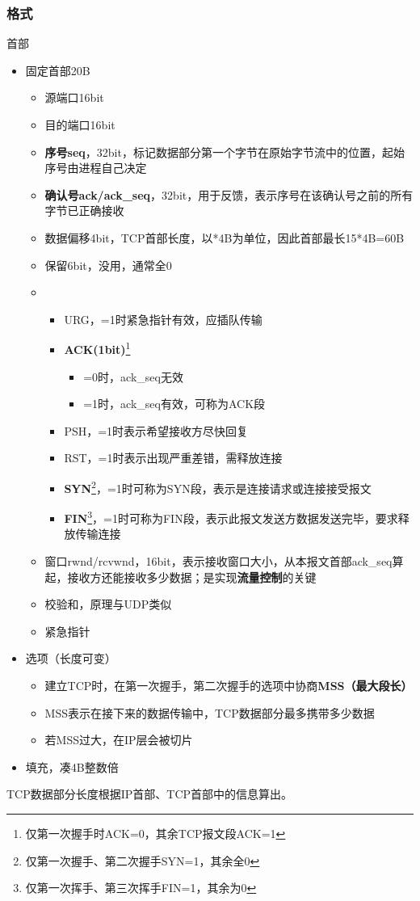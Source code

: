 \subsubsection{格式}
首部\begin{itemize}
    \item 固定首部20B\begin{itemize}
        \item 源端口16bit
        \item 目的端口16bit
        \item \textbf{序号seq}，32bit，标记数据部分第一个字节在原始字节流中的位置，起始序号由进程自己决定
        \item \textbf{确认号ack/ack\_seq}，32bit，用于反馈，表示序号在该确认号之前的所有字节已正确接收
        \item 数据偏移4bit，TCP首部长度，以*4B为单位，因此首部最长15*4B=60B
        \item 保留6bit，没用，通常全0
        \item \begin{itemize}
            \item URG，=1时紧急指针有效，应插队传输
            \item \textbf{ACK(1bit)}\footnote{仅第一次握手时ACK=0，其余TCP报文段ACK=1}
            \begin{itemize}
                \item =0时，ack\_seq无效
                \item =1时，ack\_seq有效，可称为ACK段
            \end{itemize}
            \item PSH，=1时表示希望接收方尽快回复
            \item RST，=1时表示出现严重差错，需释放连接
            \item \textbf{SYN}\footnote{仅第一次握手、第二次握手SYN=1，其余全0}，=1时可称为SYN段，表示是连接请求或连接接受报文
            \item \textbf{FIN}\footnote{仅第一次挥手、第三次挥手FIN=1，其余为0}，=1时可称为FIN段，表示此报文发送方数据发送完毕，要求释放传输连接
        \end{itemize}
        \item 窗口rwnd/rcvwnd，16bit，表示接收窗口大小，从本报文首部ack\_seq算起，接收方还能接收多少数据；是实现\textbf{流量控制}的关键
        \item 校验和，原理与UDP类似
        \item 紧急指针
    \end{itemize}
    \item 选项（长度可变）\begin{itemize}
        \item 建立TCP时，在第一次握手，第二次握手的选项中协商\textbf{MSS（最大段长）}
        \item MSS表示在接下来的数据传输中，TCP数据部分最多携带多少数据
        \item 若MSS过大，在IP层会被切片
    \end{itemize}
    \item 填充，凑4B整数倍
\end{itemize}
TCP数据部分长度根据IP首部、TCP首部中的信息算出。


